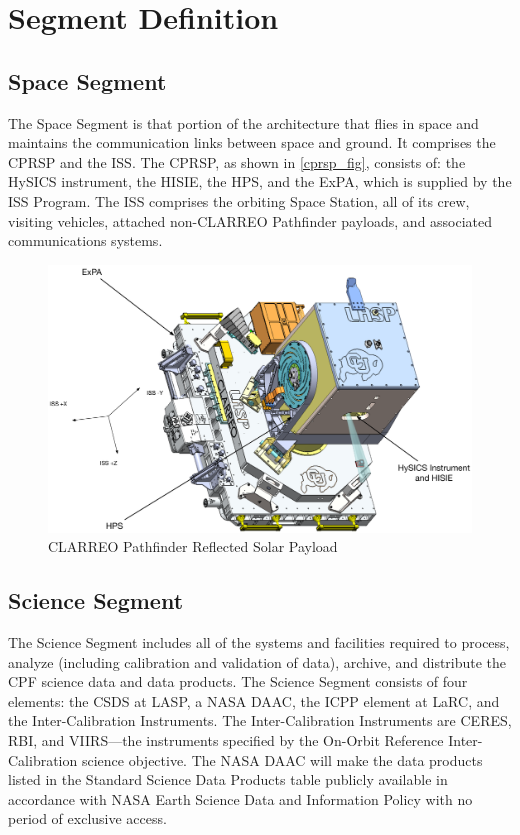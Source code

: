 \section{Segment Definition }
\label{segmentdefinition}

\subsection{Space Segment }
\label{spacesegment}

The Space Segment is that portion of the architecture that flies in space and maintains the communication links between space and ground. It comprises the \gls{CPRSP} and the \gls{ISS}. The \gls{CPRSP}, as shown in \autoref{cprsp_fig}, consists of: the \gls{HySICS} instrument, the \gls{HISIE}, the \gls{HPS}, and the \gls{ExPA}, which is supplied by the \gls{ISS} Program. The \gls{ISS} comprises the orbiting Space Station, all of its crew, visiting vehicles, attached non-\gls{CLARREO} Pathfinder payloads, and associated communications systems.

\begin{figure}[htbp]
\centering
\includegraphics[keepaspectratio,width=6.5in,height=0.75\textheight]{20170614_cprsp_cad.pdf}
\caption{\gls{CLARREO} Pathfinder Reflected Solar Payload}
\label{cprsp_fig}
\end{figure}

\subsection{Science Segment }
\label{sciencesegment}

The Science Segment includes all of the systems and facilities required to process, analyze (including calibration and validation of data), archive, and distribute the \gls{CPF} science data and data products. The Science Segment consists of four elements: the \gls{CSDS} at \gls{LASP}, a NASA \gls{DAAC}, the \gls{ICPP} element at \gls{LaRC}, and the Inter-Calibration Instruments. The Inter-Calibration Instruments are \gls{CERES}, \gls{RBI}, and \gls{VIIRS}---the instruments specified by the On-Orbit Reference Inter-Calibration science objective. The NASA \gls{DAAC} will make the data products listed in the Standard Science Data Products table publicly available in accordance with NASA Earth Science Data and Information Policy with no period of exclusive access.

